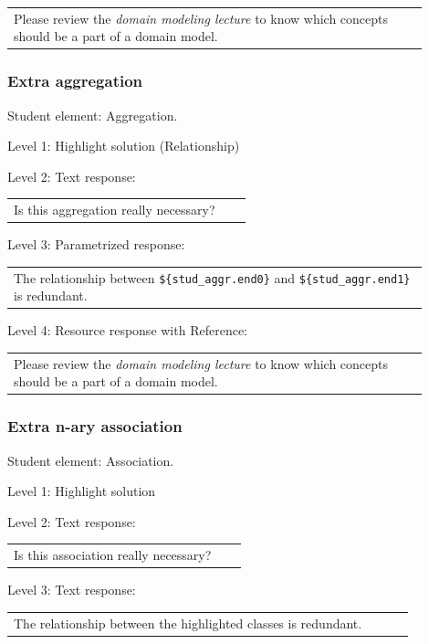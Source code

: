 \begin{tabular}{|p{0.9\linewidth}}
Please review the \textit{domain modeling lecture} to know which concepts should be a part of a domain model.
\end{tabular} \medskip


\subsubsection{Extra aggregation}

Student element: Aggregation.  \medskip

\noindent Level 1: Highlight solution (Relationship) \medskip

\noindent Level 2: Text response: \medskip

\begin{tabular}{|p{0.9\linewidth}}
Is this aggregation really necessary?
\end{tabular} \medskip

\noindent Level 3: Parametrized response: \medskip

\begin{tabular}{|p{0.9\linewidth}}
The relationship between \verb|${stud_aggr.end0}| and \verb|${stud_aggr.end1}| is redundant.
\end{tabular} \medskip

\noindent Level 4: Resource response with Reference: \medskip

\begin{tabular}{|p{0.9\linewidth}}
Please review the \textit{domain modeling lecture} to know which concepts should be a part of a domain model.
\end{tabular} \medskip


\subsubsection{Extra n-ary association}

Student element: Association.  \medskip

\noindent Level 1: Highlight solution  \medskip

\noindent Level 2: Text response: \medskip

\begin{tabular}{|p{0.9\linewidth}}
Is this association really necessary?
\end{tabular} \medskip

\noindent Level 3: Text response: \medskip

\begin{tabular}{|p{0.9\linewidth}}
The relationship between the highlighted classes is redundant.
\end{tabular} \medskip

